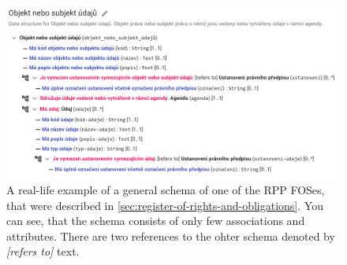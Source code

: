 \documentclass[12pt,a4paper,dvipsnames]{report}
\let\openright=\clearpage
\theoremstyle{definition}
\begin{document}
\begin{figure}
  \centering
  \includegraphics[width=\textwidth]{img/objekt_nebo_subjekt.png}
  \caption{A real-life example of a general schema of one of the RPP FOSes, that were described in \autoref{sec:register-of-rights-and-obligations}. You can see, that the schema consists of only few associations and attributes. There are two references to the ohter schema denoted by \textit{[refers to]} text.}
  \label{fig:screenshot}
\end{figure}
%

\openright
\end{document}
